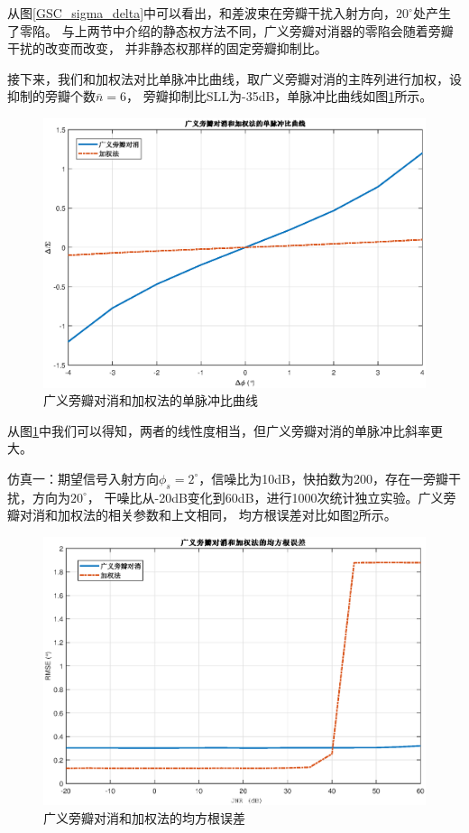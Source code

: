 \documentclass[master]{thesis-uestc}
\begin{document}
从图\ref{GSC_sigma_delta}中可以看出，和差波束在旁瓣干扰入射方向，$20^\circ$处产生了零陷。
与上两节中介绍的静态权方法不同，广义旁瓣对消器的零陷会随着旁瓣干扰的改变而改变，
并非静态权那样的固定旁瓣抑制比。

接下来，我们和加权法对比单脉冲比曲线，取广义旁瓣对消的主阵列进行加权，设抑制的旁瓣个数$\bar{n}=6$，
旁瓣抑制比SLL为-35dB，单脉冲比曲线如图\ref{GSC_MRC}所示。
\begin{figure}[H]
    \includegraphics[scale=0.5]{pic/GSC_MRC.eps}
    \caption{广义旁瓣对消和加权法的单脉冲比曲线}
    \label{GSC_MRC}
\end{figure}
从图\ref{GSC_MRC}中我们可以得知，两者的线性度相当，但广义旁瓣对消的单脉冲比斜率更大。

仿真一：期望信号入射方向$\phi_s=2^\circ$，信噪比为10dB，快拍数为200，存在一旁瓣干扰，方向为$20^\circ$，
干噪比从-20dB变化到60dB，进行1000次统计独立实验。广义旁瓣对消和加权法的相关参数和上文相同，
均方根误差对比如图\ref{GSC_RMSE}所示。
\begin{figure}[H]
    \includegraphics[scale=0.5]{pic/GSC_RMSE.eps}
    \caption{广义旁瓣对消和加权法的均方根误差}
    \label{GSC_RMSE}
\end{figure}
\end{document}

